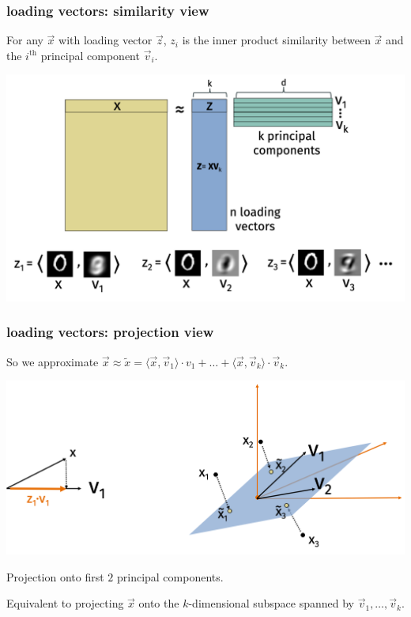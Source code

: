 \documentclass[handout,compress]{beamer}
\begin{document}
\begin{frame}[t]
	\frametitle{loading vectors: similarity view}
	For any $\vec{x}$ with loading vector $\vec{z}$, $z_i$ is the inner product similarity between $\vec{x}$ and the $i^\text{th}$ principal component $\vec{v}_i$. 
	\begin{center}
		\includegraphics[width=.8\textwidth]{simview.png}
	\end{center}	
\end{frame}

\begin{frame}[t]
	\frametitle{loading vectors: projection view}
	So we approximate $\vec{x} \approx \tilde{x} = \langle \vec{x},\vec{v}_1\rangle \cdot v_1 + \ldots + \langle \vec{x},\vec{v}_k\rangle \cdot \vec{v}_k$. 
	\begin{center}
		\includegraphics[width=.8\textwidth]{projection_orth.png}
		
		Projection onto first $2$ principal components.

	\end{center}
	Equivalent to projecting $\vec{x}$ onto the $k$-dimensional subspace spanned by $\vec{v}_1, \ldots, \vec{v}_k$. 
	
\end{frame}
\end{document}
